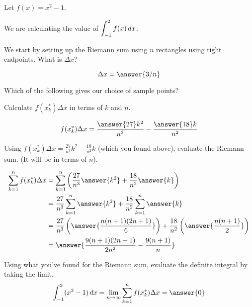 \documentclass{ximera}
\author{Bobby Ramsey}
\begin{document}
Let $f(x) = x^2-1$. 
		\begin{center}
		\end{center}

We are calculating the value of $\displaystyle \int_{-1}^{2} f(x) \mathop{}\!d x$.


\begin{exercise}
	We start by setting up the Riemann sum using $n$ rectangles using right endpoints.
	What is $\Delta x$?
	
	\[ \Delta x = \answer{3/n} \]

	\begin{exercise}
		Which of the following gives our choice of sample points?
		\begin{multipleChoice}
		\end{multipleChoice}
		
		\begin{exercise}
			Calculate $f(x_k^*) \Delta x$ in terms of $k$ and $n$.
			
			\[ f(x_k^*) \Delta x = \frac{\answer{27}k^2}{n^3}-\frac{\answer{18}k}{n^2} \]
			\begin{exercise}
				Using $f(x_k^*)\Delta x = \frac{27}{n^3}k^2 - \frac{18}{n^2}k$ (which you found above), evaluate the Riemann sum.  (It will be in terms of $n$).
				
				\begin{align*}
					\sum_{k=1}^{n} f(x_k^*)\Delta x &=  \sum_{k=1}^{n} \left(\frac{27}{n^3}\answer{k^2} + \frac{18}{n^2}\answer{k}\right)\\
						&= \frac{27}{n^3} \sum_{k=1}^{n} \answer{k^2} + \frac{18}{n^2} \sum_{k=1}^{n} \answer{k}\\
						&= \frac{27}{n^3} \left( \answer{\frac{n(n+1)(2n+1)}{6}}\right) + \frac{18}{n^2} \left( \answer{\frac{n(n+1)}{2}}\right)\\
						&= \answer{\frac{9(n+1)(2n+1)}{2n^2}-\frac{9(n+1)}{n}}
				\end{align*}
				
				\begin{exercise}
					Using what you've found for the Riemann sum, evaluate the definite integral by taking the limit.
					\[ \int_{-1}^{2} (x^2-1) \d x = \lim_{n\to\infty} \sum_{k=1}^{n} f(x_k^*)\Delta x = \answer{0} \]
				\end{exercise}
			\end{exercise}
		\end{exercise}
	\end{exercise}
\end{exercise}
\end{document}
